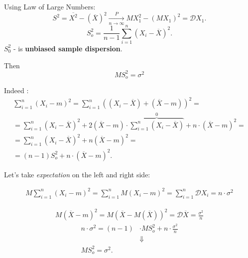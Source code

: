 Using Law of Large Numbers:
\[
    S^2 = \overline{X^2} - \left( \overline{X} \right) ^2
    \underset{n \to \infty}{\overset{P}{\to}}
    MX_1^2 - \left( MX_1 \right) ^2 = \mathcal{D}X_1
.\] 
\[
S_o^2 = \frac{1}{n-1} \sum_{i=1}^{n} \left( X_i - \overline{X} \right) ^2
.\] 
$S_0^2$ - is \textbf{unbiased sample dispersion}.

Then 
\begin{equation}
    MS_o^2 = \sigma^2
\end{equation}

Indeed :
\begin{gather*}
    \sum_{i=1}^{n} \left( X_i - m \right) ^2
    = \sum_{i=1}^{n} \left( \left( X_i - \overline{X} \right) + \left( \overline{X} - m \right)  \right) ^2 = \\
    = \sum_{i=1}^{n} \left( X_i - \overline{X} \right) ^2 + 2\left( \overline{X} - m \right) \cdot \overbrace{\sum_{i=1}^{n} \left( X_i - \overline{X} \right)}^0 + 
    n \cdot \left( \overline{X} - m \right) ^2 = \\
    = \sum_{i=1}^{n} \left( X_i - \overline{X} \right) ^2 + n \left( \overline{X} - m \right) ^2 = \\
    = \left( n-1 \right) S_o^2 + n \cdot \left( \overline{X} -m \right) ^2.
\end{gather*}

Let's take \textit{expectation} on the left and right side:

\begin{gather*}
   M \sum_{i=1}^{n} \left( X_i - m \right) ^2 =
   \sum_{i=1}^{n} M \left( X_i - m \right) ^2 =
   \sum_{i=1}^{n} \mathcal{D}X_i = n \cdot \sigma^2
\end{gather*}

\begin{gather*}
    M\left( \overline{X} - m \right) ^2 = M\left( \overline{X} - M\left( \overline{X} \right)  \right) ^2 = \mathcal{D}\overline{X} = \frac{\sigma^2}{n}
\end{gather*}
\begin{align*}
    n \cdot \sigma^2 = \left( n-1 \right) & \cdot MS_o^2 + n \cdot \frac{\sigma^2}{n} \\
    & \Downarrow \\
    MS_o^2 = \sigma^2
.\end{align*}
